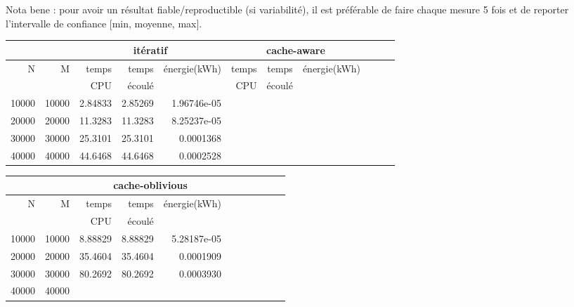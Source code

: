 \documentclass[10pt,a4paper]{article}
\begin{document}
{{Nota bene : pour avoir un résultat fiable/reproductible (si variabilité), 
il est préférable de faire chaque mesure 5 fois et de reporter l'intervalle
de confiance [min, moyenne, max].

\begin{tabular}{|r|r||r|r|r||r|r|r||r|r|r||}
\hline
 \multicolumn{2}{|c||}{ } 
& \multicolumn{3}{c||}{itératif}
& \multicolumn{3}{c||}{cache-aware}

\\ \hline
N & M 
& temps   & temps & énergie(kWh)      %
& temps   & temps & énergie(kWh)      %

\\
& 
& CPU     & écoulé&               %
& CPU     & écoulé&               %

\\ \hline
\hline
10000 & 10000 
& 2.84833 & 2.85269  & 1.96746e-05  %
&  &  &   %

\\ \hline
20000 & 20000 
& 11.3283 & 11.3283 & 8.25237e-05  %
&  &  &   %

\\ \hline
30000 & 30000 
& 25.3101 & 25.3101 & 0.0001368 %
&  &  &   %
\\ \hline
40000 & 40000 
& 44.6468  & 44.6468  & 0.0002528  %
&  &  &   %
\\ \hline
\hline
\end{tabular}

\begin{tabular}{|r|r||r|r|r||r|r|r||r|r|r||}
  \hline
   \multicolumn{2}{|c||}{ } 
   & \multicolumn{3}{c||}{cache-oblivious}
   \\ \hline
N & M 

& temps   & temps & énergie(kWh)       %
\\
& 

& CPU     & écoulé&               %
\\ \hline
\hline
10000 & 10000 

& 8.88829  & 8.88829  & 5.28187e-05  %
\\ \hline
20000 & 20000 

& 35.4604 & 35.4604 & 0.0001909  %
\\ \hline
30000 & 30000 

& 80.2692 & 80.2692 & 0.0003930  %
\\ \hline
40000 & 40000 


\end{tabular}}}
\end{document}
